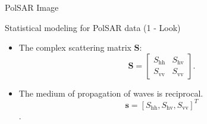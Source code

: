 \documentclass[10pt]{beamer}
\begin{document}
\begin{frame}[fragile]{PolSAR Image}
\begin{alertblock}{Statistical modeling for PolSAR data (1 - Look)}
\begin{itemize}
\item The complex scattering matrix $\mathbf{S}$:
\begin{equation}
\mathbf{S} = \left[
\begin{array}{cc}
	S_\text{hh}   & S_\text{hv}   \\
	S_\text{vv}   & S_\text{vv}   
\end{array}
\right].
\end{equation}\label{eq_01}
\item The medium of propagation of waves is reciprocal.
$$\mathbf{s}=[S_\text{hh},S_\text{hv},S_{\text{vv}}]^T$$.
\end{itemize}
\end{alertblock}
\end{frame}
\end{document}

